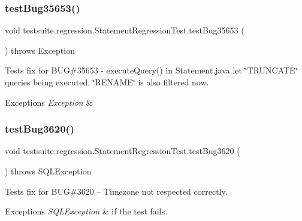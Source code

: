 \subsubsection{\texorpdfstring{test\+Bug35653()}{testBug35653()}}
{\footnotesize\ttfamily void testsuite.\+regression.\+Statement\+Regression\+Test.\+test\+Bug35653 (\begin{DoxyParamCaption}{ }\end{DoxyParamCaption}) throws Exception}

Tests fix for B\+UG\#35653 -\/ execute\+Query() in Statement.\+java let \char`\"{}\+T\+R\+U\+N\+C\+A\+T\+E\char`\"{} queries being executed. \char`\"{}\+R\+E\+N\+A\+M\+E\char`\"{} is also filtered now.


\begin{DoxyExceptions}{Exceptions}
{\em Exception} & \\
\hline
\end{DoxyExceptions}
\mbox{\label{classtestsuite_1_1regression_1_1_statement_regression_test_aff7b0f7e5043e4a16d128d96ad607be6}} 
\subsubsection{\texorpdfstring{test\+Bug3620()}{testBug3620()}}
{\footnotesize\ttfamily void testsuite.\+regression.\+Statement\+Regression\+Test.\+test\+Bug3620 (\begin{DoxyParamCaption}{ }\end{DoxyParamCaption}) throws S\+Q\+L\+Exception}

Tests fix for B\+UG\#3620 -- Timezone not respected correctly.


\begin{DoxyExceptions}{Exceptions}
{\em S\+Q\+L\+Exception} & if the test fails. \\
\hline
\end{DoxyExceptions}
\mbox{\label{classtestsuite_1_1regression_1_1_statement_regression_test_a2977c93f45f1a9ec78b20348f2d4e290}} 
